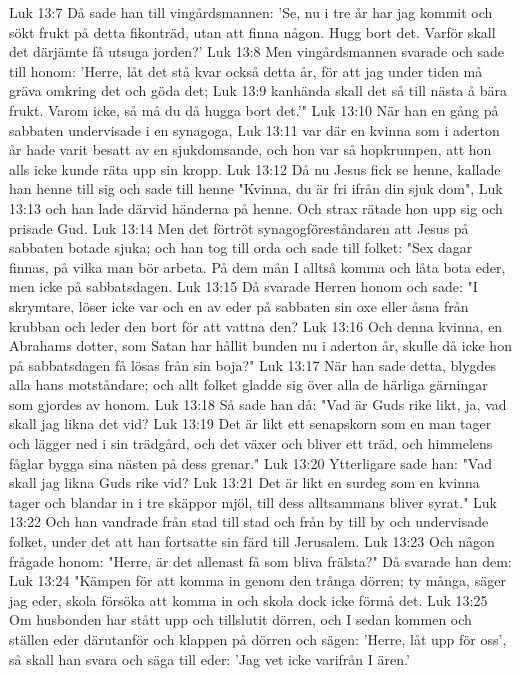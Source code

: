 Luk 13:7  Då sade han till vingårdsmannen: 'Se, nu i tre år har jag kommit och sökt frukt på detta fikonträd, utan att finna någon. Hugg bort det. Varför skall det därjämte få utsuga jorden?'
Luk 13:8  Men vingårdsmannen svarade och sade till honom: 'Herre, låt det stå kvar också detta år, för att jag under tiden må gräva omkring det och göda det;
Luk 13:9  kanhända skall det så till nästa å bära frukt. Varom icke, så må du då hugga bort det.'"
Luk 13:10  När han en gång på sabbaten undervisade i en synagoga,
Luk 13:11  var där en kvinna som i aderton år hade varit besatt av en sjukdomsande, och hon var så hopkrumpen, att hon alls icke kunde räta upp sin kropp.
Luk 13:12  Då nu Jesus fick se henne, kallade han henne till sig och sade till henne "Kvinna, du är fri ifrån din sjuk dom",
Luk 13:13  och han lade därvid händerna på henne. Och strax rätade hon upp sig och prisade Gud.
Luk 13:14  Men det förtröt synagogföreståndaren att Jesus på sabbaten botade sjuka; och han tog till orda och sade till folket: "Sex dagar finnas, på vilka man bör arbeta. På dem mån I alltså komma och låta bota eder, men icke på sabbatsdagen.
Luk 13:15  Då svarade Herren honom och sade: "I skrymtare, löser icke var och en av eder på sabbaten sin oxe eller åsna från krubban och leder den bort för att vattna den?
Luk 13:16  Och denna kvinna, en Abrahams dotter, som Satan har hållit bunden nu i aderton år, skulle då icke hon på sabbatsdagen få lösas från sin boja?"
Luk 13:17  När han sade detta, blygdes alla hans motståndare; och allt folket gladde sig över alla de härliga gärningar som gjordes av honom.
Luk 13:18  Så sade han då: "Vad är Guds rike likt, ja, vad skall jag likna det vid?
Luk 13:19  Det är likt ett senapskorn som en man tager och lägger ned i sin trädgård, och det växer och bliver ett träd, och himmelens fåglar bygga sina nästen på dess grenar."
Luk 13:20  Ytterligare sade han: "Vad skall jag likna Guds rike vid?
Luk 13:21  Det är likt en surdeg som en kvinna tager och blandar in i tre skäppor mjöl, till dess alltsammans bliver syrat."
Luk 13:22  Och han vandrade från stad till stad och från by till by och undervisade folket, under det att han fortsatte sin färd till Jerusalem.
Luk 13:23  Och någon frågade honom: "Herre, är det allenast få som bliva frälsta?" Då svarade han dem:
Luk 13:24  "Kämpen för att komma in genom den trånga dörren; ty många, säger jag eder, skola försöka att komma in och skola dock icke förmå det.
Luk 13:25  Om husbonden har stått upp och tillslutit dörren, och I sedan kommen och ställen eder därutanför och klappen på dörren och sägen: 'Herre, låt upp för oss', så skall han svara och säga till eder: 'Jag vet icke varifrån I ären.'
